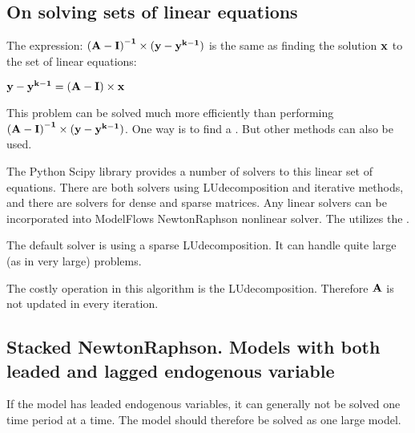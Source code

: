 \documentclass[letterpaper,10pt,english]{jupyterBook}
\begin{document}
\subsection{On solving sets of linear equations}
\label{\detokenize{content/notebooks/intro/model and solution:on-solving-sets-of-linear-equations}}
\sphinxAtStartPar
The expression: \(\bf{(A-I)}^{-1}\times  (\bf{y - y^{k-1}})\) is the same as finding the solution \(\bf{x}\) to the set of linear equations:

\sphinxAtStartPar
\(\bf{y- y^{k-1} } = \bf{(A-I)} \times \bf{x}\)

\sphinxAtStartPar
This problem can be solved much more efficiently than performing \(\bf{(A-I)}^{-1}\times  ( \bf{y - y^{k-1} })\). One way is to
find a . But other methods can also be used.

\sphinxAtStartPar
The Python Scipy library provides a number of solvers to this linear set of equations. There are both solvers using LU\sphinxhyphen{}decomposition and iterative methods, and there are solvers for dense and sparse matrices. Any linear solvers can be incorporated into ModelFlows Newton\sphinxhyphen{}Raphson nonlinear solver. The  utilizes the .

\sphinxAtStartPar
The default solver is using a sparse LU\sphinxhyphen{}decomposition. It can handle quite large (as in very large) problems.

\sphinxAtStartPar
The costly operation in this algorithm is the LU\sphinxhyphen{}decomposition. Therefore  \(\bf{A}\) is not updated in every iteration.


\subsection{Stacked Newton\sphinxhyphen{}Raphson. Models with both leaded and lagged endogenous variable}
\label{\detokenize{content/notebooks/intro/model and solution:stacked-newton-raphson-models-with-both-leaded-and-lagged-endogenous-variable}}
\sphinxAtStartPar
If the model has leaded endogenous variables, it can generally not be solved one time period at a time. The model should therefore be solved as one large model.
\end{document}
